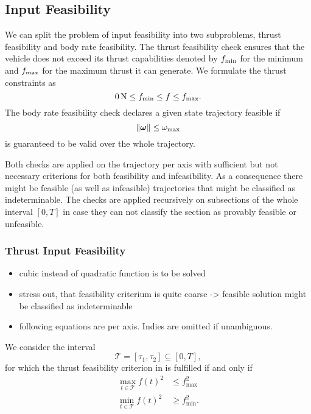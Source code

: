\subsection{Input Feasibility}
\label{sec:input-feasibility}

We can split the problem of input feasibility into two subproblems, thrust feasibility and body rate feasibility. The thrust feasibility check ensures that the vehicle does not exceed its thrust capabilities denoted by $\mbox{$f_\text{min}$}$ for the minimum and $\mbox{$f_\text{max}$}$ for the maximum thrust it can generate.
We formulate the thrust constraints as
\begin{equation}
	\label{eq:thrust-limits}
	\unit[0]{N} \leq f_\text{min} \leq f \leq f_\text{max}
	.
\end{equation}
The body rate feasibility check declares a given state trajectory feasible if
\begin{equation}
	\label{eq:body-rates-limit}
	\left\lVert\mbox{$\bm{\omega}$}\right\rVert
	\leq
	\omega_\text{max}
\end{equation}
is guaranteed to be valid over the whole trajectory.

Both checks are applied on the trajectory per axis with sufficient but not necessary criterions for both feasibility and infeasibility. As a consequence there might be feasible (as well as infeasible) trajectories that might be classified as indeterminable. The checks are applied recursively on subsections of the whole interval $\left[0,T\right]$ in case they can not classify the section as provably feasible or unfeasible.

\subsubsection{Thrust Input Feasibility}
\begin{itemize}
	\color{red}
	\item cubic instead of quadratic function is to be solved
	\item stress out, that feasibility criterium is quite coarse -> feasible solution might be classified as indeterminable
	\item following equations are per axis. Indies are omitted if unambiguous.
\end{itemize}
We consider the interval 
\begin{equation}
	\mathcal{T} = \left[\tau_1,\tau_2\right] \subseteq \left[0,T\right]
	,
\end{equation}
for which the thrust feasibility criterion in  is fulfilled if and only if
\begin{align}
	\label{eq:thrust-feasibility-equivilency-max}
	\max_{t \in \mathcal{T}} f(t)^2
	&\leq
	f_\text{max}^2 \\
	\label{eq:thrust-feasibility-equivilency-min}
	\min_{t \in \mathcal{T}} f(t)^2
	&\geq
	f_\text{min}^2
	.
\end{align}


